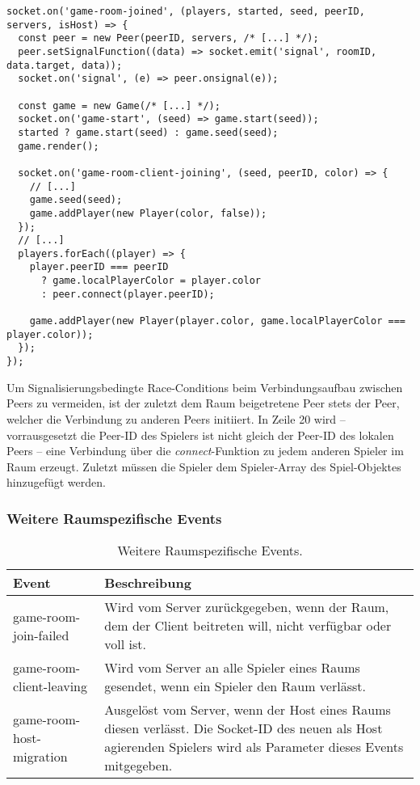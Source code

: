 \vspace{11pt}
\lstset{language=js, style=STYLE_CODE_JS}
\begin{singlespace}
\begin{lstlisting}[caption={Raumbeitritt auf der Client-Seite -- game.js}, captionpos=b, label={lst:clientroomjoin}]
socket.on('game-room-joined', (players, started, seed, peerID, servers, isHost) => {
  const peer = new Peer(peerID, servers, /* [...] */);
  peer.setSignalFunction((data) => socket.emit('signal', roomID, data.target, data)); 
  socket.on('signal', (e) => peer.onsignal(e));

  const game = new Game(/* [...] */);
  socket.on('game-start', (seed) => game.start(seed));
  started ? game.start(seed) : game.seed(seed);
  game.render();

  socket.on('game-room-client-joining', (seed, peerID, color) => {
	// [...]
    game.seed(seed);
    game.addPlayer(new Player(color, false));
  });
  // [...]
  players.forEach((player) => {
    player.peerID === peerID 
      ? game.localPlayerColor = player.color 
      : peer.connect(player.peerID);
      
    game.addPlayer(new Player(player.color, game.localPlayerColor === player.color));
  });
});
\end{lstlisting}
\end{singlespace}

Um Signalisierungsbedingte \glqq{}Race-Conditions\grqq{} beim Verbindungsaufbau zwischen Peers zu vermeiden, ist der zuletzt dem Raum beigetretene Peer stets der Peer, welcher die Verbindung zu anderen Peers initiiert. In Zeile 20 wird -- vorrausgesetzt die Peer-ID des Spielers ist nicht gleich der Peer-ID des lokalen Peers -- eine Verbindung über die \textit{connect}-Funktion zu jedem anderen Spieler im Raum erzeugt. Zuletzt müssen die Spieler dem Spieler-Array des Spiel-Objektes hinzugefügt werden.

\subsubsection{Weitere Raumspezifische Events}
\begin{table}[ht]
\centering
\begin{tabularx}{\textwidth}{lX}
\toprule
Event&Beschreibung\\

\midrule
game-room-join-failed&Wird vom Server zurückgegeben, wenn der Raum, dem der Client beitreten will, nicht verfügbar oder voll ist.\\
game-room-client-leaving&Wird vom Server an alle Spieler eines Raums gesendet, wenn ein Spieler den Raum verlässt.\\
game-room-host-migration&Ausgelöst vom Server, wenn der Host eines Raums diesen verlässt. Die Socket-ID des neuen als Host agierenden Spielers wird als Parameter dieses Events mitgegeben.\\
\bottomrule

\end{tabularx}
\caption{Weitere Raumspezifische Events.}
\label{table:otherevents}
\end{table}

